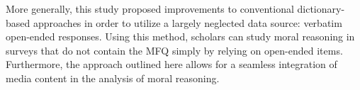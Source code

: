 \documentclass[12pt]{article}
\begin{document}
More generally, this study proposed improvements to conventional dictionary-based approaches in order to utilize a largely neglected data source: verbatim open-ended responses. Using this method, scholars can study moral reasoning in surveys that do not contain the MFQ simply by relying on open-ended items. Furthermore, the approach outlined here allows for a seamless integration of media content in the analysis of moral reasoning.







\end{document}
